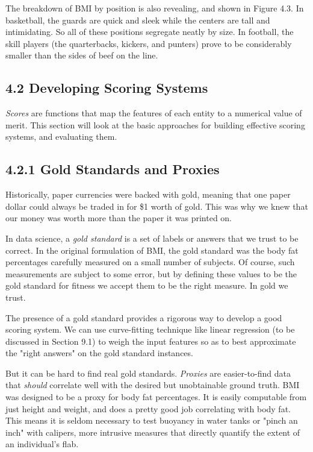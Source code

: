 \documentclass[10pt]{article}
\begin{document}
The breakdown of BMI by position is also revealing, and shown in Figure 4.3. In basketball, the guards are quick and sleek while the centers are tall and intimidating. So all of these positions segregate neatly by size. In football, the skill players (the quarterbacks, kickers, and punters) prove to be considerably smaller than the sides of beef on the line.

\subsection*{4.2 Developing Scoring Systems}
\textit{Scores} are functions that map the features of each entity to a numerical value of merit. This section will look at the basic approaches for building effective scoring systems, and evaluating them.

\subsection*{4.2.1 Gold Standards and Proxies}
Historically, paper currencies were backed with gold, meaning that one paper dollar could always be traded in for \$1 worth of gold. This was why we knew that our money was worth more than the paper it was printed on.

In data science, a \textit{gold standard} is a set of labels or answers that we trust to be correct. In the original formulation of BMI, the gold standard was the body fat percentages carefully measured on a small number of subjects. Of course, such measurements are subject to some error, but by defining these values to be the gold standard for fitness we accept them to be the right measure. In gold we trust.

The presence of a gold standard provides a rigorous way to develop a good scoring system. We can use curve-fitting technique like linear regression (to be discussed in Section 9.1) to weigh the input features so as to best approximate the "right answers" on the gold standard instances.

But it can be hard to find real gold standards. \textit{Proxies} are easier-to-find data that \textit{should} correlate well with the desired but unobtainable ground truth. BMI was designed to be a proxy for body fat percentages. It is easily computable from just height and weight, and does a pretty good job correlating with body fat. This means it is seldom necessary to test buoyancy in water tanks or "pinch an inch" with calipers, more intrusive measures that directly quantify the extent of an individual's flab.
\end{document}
